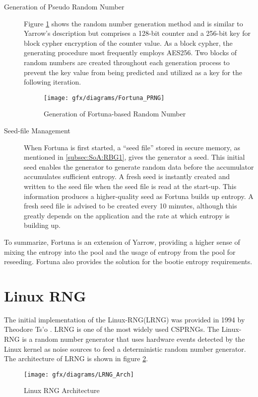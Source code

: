 \begin{description}
	\item[Generation of Pseudo Random Number] Figure \ref{fig:3:14} shows the random number generation method and is similar to Yarrow’s description but comprises a 128-bit counter and a 256-bit key for block cypher encryption of the counter value. As a block cypher, the generating procedure most frequently employs AES256. Two blocks of random numbers are created throughout each generation process to prevent the key value from being predicted and utilized as a key for the following iteration.
	\begin{figure}[htbp]
		\centering
		\texttt{[image: gfx/diagrams/Fortuna\_PRNG]}
		\caption{Generation of Fortuna-based Random Number}
		\label{fig:3:14}
	\end{figure}
	
	\item[Seed-file Management] When Fortuna is first started, a “seed file” stored in secure memory, as mentioned in \ref{subsec:SoA:RBG1}, gives the generator a seed. This initial seed enables the generator to generate random data before the accumulator accumulates sufficient entropy. A fresh seed is instantly created and written to the seed file when the seed file is read at the start-up. This information produces a higher-quality seed as Fortuna builds up entropy. A fresh seed file is advised to be created every 10 minutes, although this greatly depends on the application and the rate at which entropy is building up.
\end{description}

To summarize, Fortuna is an extension of Yarrow, providing a higher sense of mixing the entropy into the pool and the usage of entropy from the pool for reseeding. Fortuna also provides the solution for the bootie entropy requirements.

%
%
\section{Linux RNG}
\label{sec:SoA:LRNG}
The initial implementation of the Linux-RNG(LRNG) was provided in 1994 by Theodore Ts’o \cite{LRNG-2022}. LRNG is one of the most widely used CSPRNGs. The Linux-RNG is a random number generator that uses hardware events detected by the Linux kernel as noise sources to feed a deterministic random number generator. The architecture of LRNG is shown in figure \ref{fig:3:15}.

\begin{figure}[htbp]
	\centering
	\texttt{[image: gfx/diagrams/LRNG\_Arch]}
	\caption{Linux RNG Architecture \cite{LRNG-2022}}
	\label{fig:3:15}
\end{figure}

